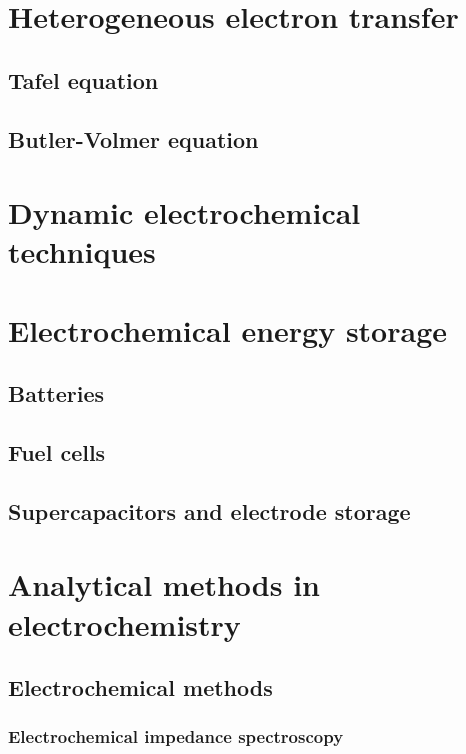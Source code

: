 \documentclass{article}
\numberwithin{theorem}{section}
\numberwithin{corollary}{section}
\numberwithin{postulate}{section}
\numberwithin{lemma}{section}
\numberwithin{definition}{section}
\begin{document}
\section{Heterogeneous electron transfer}

\subsection{Tafel equation}

\subsection{Butler-Volmer equation}

\section{Dynamic electrochemical techniques}

\section{Electrochemical energy storage}

\subsection{Batteries}

\subsection{Fuel cells}

\subsection{Supercapacitors and electrode storage}

\section{Analytical methods in electrochemistry}

\subsection{Electrochemical methods}

\subsubsection{Electrochemical impedance spectroscopy}
\end{document}
